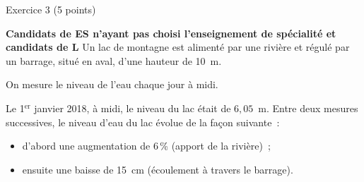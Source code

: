 
%
\begin{h2}Exercice 3 (5 points)\end{h2}
\textbf{Candidats de ES n'ayant pas choisi l'enseignement de spécialité et candidats de L}
\medbreak
Un lac de montagne est alimenté par une rivière et régulé par un barrage, situé en aval, d'une hauteur de 10~m.
\par
On mesure le niveau de l'eau chaque jour à midi.
\par
Le 1${^\text{er}}$ janvier 2018, à midi, le niveau du lac était de $6,05$~m.
\smallbreak
Entre deux mesures successives, le niveau d'eau du lac évolue de la façon suivante~:
\begin{itemize}[label=---]
     \item d'abord une augmentation de 6\,\% (apport de la rivière)~;
     \item ensuite une baisse de 15~cm (écoulement à travers le barrage).
\end{itemize}
